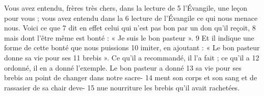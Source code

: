 Vous avez entendu, frères très chers, dans la lecture de	 
5	 	l'Évangile, une leçon pour vous ; vous avez entendu dans la	 
6	 	lecture de l'Évangile ce qui nous menace nous. Voici ce que	 
7	 	dit en effet celui qui n'est pas bon par un don qu'il reçoit,	 
8	 	mais dont l'être même est bonté : « Je suis le bon pasteur ».	 
9	 	Et il indique une forme de cette bonté que nous puissions	 
10	 	imiter, en ajoutant : « Le bon pasteur donne sa vie pour ses	 
11	 	brebis ». Ce qu'il a recommandé, il l'a fait ; ce qu'il a	 
12	 	ordonné, il en a donné l'exemple. Le bon pasteur a donné	 
13	 	sa vie pour ses brebis au point de changer dans notre sacre-	 
14	 	ment son corps et son sang et de rassasier de sa chair deve-	 
15	 	nue nourriture les brebis qu'il avait rachetées.